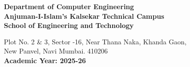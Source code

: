 \begin{center}
\vspace{-0.2cm}

\linespread{1.0}
\textbf{\Large Department of Computer Engineering\\
\normalsize Anjuman-I-Islam's Kalsekar Technical Campus\\
\normalsize School of Engineering and Technology\\
}

\linespread{1.0}\normalsize{Plot No. 2 \& 3, Sector -16, Near Thana Naka, Khanda Gaon,\\
New Panvel, Navi Mumbai. 410206}\\

\vspace{0.3cm}
\textbf{\large Academic Year: 2025-26}\\

\thispagestyle{empty}
\end{center}